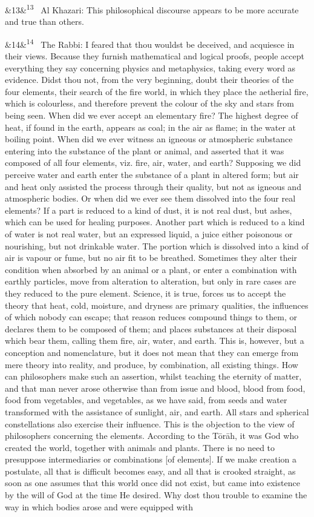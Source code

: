 \documentclass[12pt]{article}
\newcommand{\para}[1][]{\par\noindent\ifx&#1&\else\textsuperscript{\footnotesize #1}~\fi}
\begin{document}
\para[13] Al Khazari: This philosophical discourse appears to be more accurate and true than others.

\para[14] The Rabbi: I feared that thou wouldst be deceived, and acquiesce in their views. Because they furnish mathematical and logical proofs, people accept everything they say concerning physics and metaphysics, taking every word as evidence. Didst thou not, from the very beginning, doubt their theories of the four elements, their search of the fire world, in which they place the aetherial fire, which is colourless, and therefore prevent the colour of the sky and stars from being seen. When did we ever accept an elementary fire? The highest degree of heat, if found in the earth, appears as coal; in the air as flame; in the water at boiling point. When did we ever witness an igneous or atmospheric substance entering into the substance of the plant or animal, and asserted that it was composed of all four elements, viz. fire, air, water, and earth? Supposing we did perceive water and earth enter the substance of a plant in altered form; but air and heat only assisted the process through their quality, but not as igneous and atmospheric bodies. Or when did we ever see them dissolved into the four real elements? If a part is reduced to a kind of dust, it is not real dust, but ashes, which can be used for healing purposes. Another part which is reduced to a kind of water is not real water, but an expressed liquid, a juice either poisonous or nourishing, but not drinkable water. The portion which is dissolved into a kind of air is vapour or fume, but no air fit to be breathed. Sometimes they alter their condition when absorbed by an animal or a plant, or enter a combination with earthly particles, move from alteration to alteration, but only in rare cases are they reduced to the pure element. Science, it is true, forces us to accept the theory that heat, cold, moisture, and dryness are primary qualities, the influences of which nobody can escape; that reason reduces compound things to them, or declares them to be composed of them; and places substances at their disposal which bear them, calling them fire, air, water, and earth. This is, however, but a conception and nomenclature, but it does not mean that they can emerge from mere theory into reality, and produce, by combination, all existing things. How can philosophers make such an assertion, whilst teaching the eternity of matter, and that man never arose otherwise than from issue and blood, blood from food, food from vegetables, and vegetables, as we have said, from seeds and water transformed with the assistance of sunlight, air, and earth. All stars and spherical constellations also exercise their influence. This is the objection to the view of philosophers concerning the elements. According to the Tōrāh, it was God who created the world, together with animals and plants. There is no need to presuppose intermediaries or combinations [of elements]. If we make creation a postulate, all that is difficult becomes easy, and all that is crooked straight, as soon as one assumes that this world once did not exist, but came into existence by the will of God at the time He desired. Why dost thou trouble to examine the way in which bodies arose and were equipped with 
\end{document}
